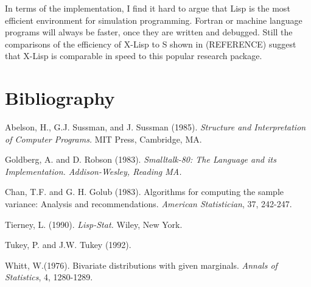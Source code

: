 In terms of the implementation, I find it hard to argue that Lisp is the
most efficient environment for simulation programming.  Fortran or
machine language programs will always be faster, once they are written
and debugged.  Still the comparisons of the efficiency of X-Lisp to S
shown in (REFERENCE) suggest that X-Lisp is comparable in speed to this
popular research package.



\section*{Bibliography}


\begin{list}{}{\parindent 0in \leftmargin 0in}

\item Abelson, H., G.J. Sussman, and J. Sussman (1985).  {\it Structure
and Interpretation of Computer Programs.}  MIT Press, Cambridge, MA.

\item Goldberg, A. and D. Robson (1983). {\it Smalltalk-80:  The
Language and its Implementation.   Addison-Wesley, Reading MA.}

\item Chan, T.F. and G. H. Golub (1983).  Algorithms for computing
the sample variance:  Analysis and recommendations. {\it American
Statistician}, 37, 242-247.

\item Tierney, L. (1990). {\it Lisp-Stat.}  Wiley, New York.

\item Tukey, P. and J.W. Tukey (1992).

\item Whitt, W.(1976). Bivariate distributions with given marginals.
{\it Annals of Statistics}, 4, 1280-1289.

\end{list}




